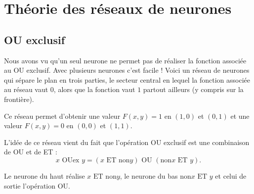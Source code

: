 \documentclass[11pt,class=report,crop=false]{standalone}
\begin{document}



\section{Théorie des réseaux de neurones}

\subsection{OU exclusif}

Nous avons vu qu'un seul neurone ne permet pas de réaliser la fonction associée au \og{}OU exclusif\fg{}.
Avec plusieurs neurones c'est facile !
Voici un réseau de neurones qui sépare le plan en trois parties, le secteur central en lequel la fonction associée au réseau vaut $0$, alors que la fonction vaut $1$ partout ailleurs (y compris sur la frontière).




Ce réseau permet d'obtenir une valeur $F(x,y)=1$ en $(1,0)$ et $(0,1)$ et une valeur $F(x,y)=0$ en $(0,0)$ et $(1,1)$.

L'idée de ce réseau vient du fait que l'opération \og{}OU exclusif\fg{} est une combinaison de \og{}OU\fg{} et de \og{}ET\fg{} :
$$x \text{ OUex } y  = (x \text{ ET } \text{non} y) \text{ OU } ( \text{non} x \text{ ET } y).$$


\begin{center}
\begin{minipage}{0.60\textwidth}
\end{minipage}
\begin{minipage}{0.39\textwidth}
\end{minipage}
\end{center}

Le neurone du haut réalise \og{}$x \text{ ET } \text{non} y$\fg{}, le neurone du bas \og{}$\text{non} x \text{ ET } y$\fg{} et celui de sortie l'opération \og{}OU\fg{}.
\end{document}
